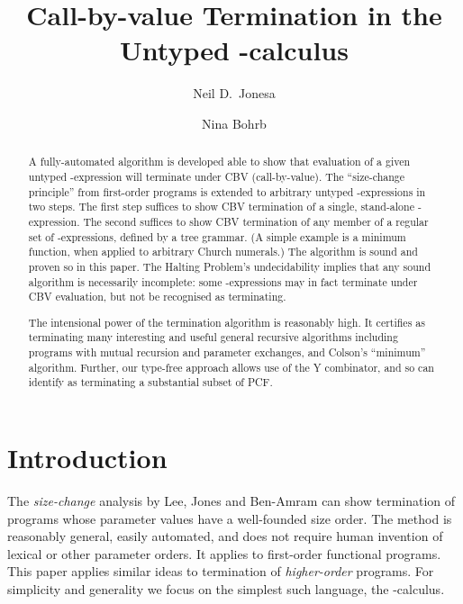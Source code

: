 \documentclass{LMCS}
\theoremstyle{definition}\newtheorem{env}[thm]{Environment}
\begin{document}
\title{Call-by-value Termination in the Untyped -calculus}

\author[N.~D.~Jones]{Neil D.~Jones\rsuper a}
\address{{\lsuper a}DIKU, University of Copenhagen, Denmark}

\author[N.~Bohr]{Nina Bohr\rsuper b}
\address{{\lsuper b}IT-University of Copenhagen, Denmark}

 



\begin{abstract}
A fully-automated algorithm is developed able to show that evaluation
of a given untyped -expression will terminate under CBV
(call-by-value).  The ``size-change principle'' from first-order
programs is extended to arbitrary untyped -expressions in two
steps.  The first step suffices to show CBV termination of a single,
stand-alone -expression. The second suffices to show CBV
termination of any member of a regular set of -expressions,
defined by a tree grammar.  (A simple example is a minimum function,
when applied to arbitrary Church numerals.)  The algorithm is sound
and proven so in this paper. The Halting Problem's undecidability
implies that any sound algorithm is necessarily incomplete: some
-expressions may in fact terminate under CBV evaluation, but
not be recognised as terminating.

The intensional power of the termination algorithm is reasonably
high. It certifies as terminating many interesting and useful general
recursive algorithms including programs with mutual recursion and
parameter exchanges, and Colson's ``minimum'' algorithm.  Further, our
type-free approach allows use of the Y combinator, and so can identify
as terminating a substantial subset of PCF.

\end{abstract}

\maketitle
\bigskip
\bigskip

\tableofcontents\newpage

\section{Introduction}

\noindent The {\em size-change} analysis by Lee, Jones and Ben-Amram
\cite{popl01} can show termination of programs whose parameter values
have a well-founded size order.  The method is reasonably general,
easily automated, and does not require human invention of lexical or
other parameter orders.  It applies to first-order functional
programs. This paper applies similar ideas to termination of {\em
higher-order} programs. For simplicity and generality we focus on the
simplest such language, the -calculus.
\end{document}
